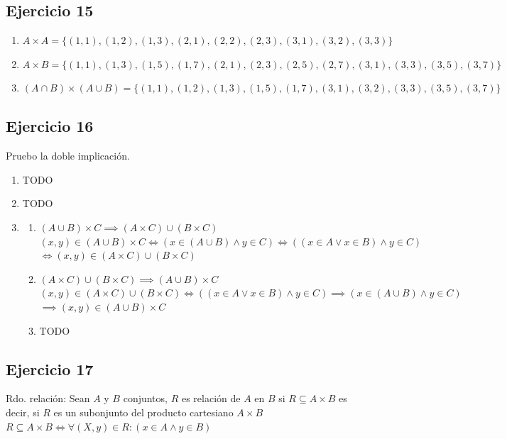 \subsection{Ejercicio 15}
\begin{enumerate}
    \item $A \times A = \{(1,1),(1,2),(1,3),(2,1),(2,2),(2,3),(3,1),(3,2),(3,3)\}$
    \item $A \times B = \{(1,1),(1,3),(1,5),(1,7),(2,1),(2,3),(2,5),(2,7),(3,1),(3,3),(3,5),(3,7)\}$
    \item $(A\cap B) \times (A\cup B) = \{(1,1),(1,2),(1,3),(1,5),(1,7),(3,1),(3,2),(3,3),(3,5),(3,7)\}$
\end{enumerate}

\subsection{Ejercicio 16}
Pruebo la doble implicación. 
\begin{enumerate}[label=(\alph*)]
    \item TODO
    \item TODO
    \item \begin{enumerate}
        \item $(A \cup B) \times C \implies (A \times C) \cup (B \times C)$\\
                $(x, y) \in (A\cup B) \times C \iff (x \in (A\cup B) \wedge y \in C) \iff ((x \in A \vee x \in B) \wedge y \in C)$\\
                $\iff (x,y) \in (A\times C) \cup (B \times C)$
        \item $(A \times C) \cup (B \times C) \implies (A \cup B) \times C$\\
                $(x,y) \in (A \times C) \cup (B \times C) \iff ((x \in A \vee x \in B) \wedge y\in C) \implies (x\in (A \cup B) \wedge y \in C)$\\
                $\implies (x, y) \in (A \cup B) \times C$ 
    \item TODO
    \end{enumerate}
\end{enumerate}

\subsection{Ejercicio 17}
Rdo. relación: Sean $A$ y $B$ conjuntos, $R$ es relación de $A$ en $B$ si $R \subseteq A\times B$ es decir, si $R$ es un subonjunto del producto cartesiano $A \times B$\\
$R \subseteq A \times B \iff \forall (X,y) \in R : (x \in A \wedge y \in B)$

